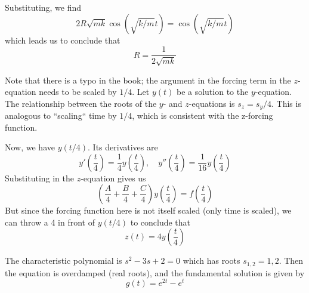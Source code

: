 \documentclass[a4paper]{article}
\begin{document}
\vspace{12pt}


Substituting, we find
\[
	2R \sqrt{mk} \cos\!\left( \sqrt{k / m } t \right) = \cos\!\left( \sqrt{k / m } t \right)  
\]
which leads us to conclude that
\[
	R = \frac{1}{2 \sqrt{mk}} 
\]


Note that there is a typo in the book; the argument in the forcing term in the \( z \)-equation needs to be scaled by \( 1/4 \). Let \( y \!\left( t  \right) \) be a solution to the \( y \)-equation. The relationship between the roots of the \( y \)- and \( z \)-equations is \( s_{z} = s_{y}/4 \). This is analogous to ``scaling`` time by \( 1/4 \), which is consistent with the z-forcing function.

Now, we have \( y \!\left( t / 4 \right) \). Its derivatives are
\[
	y'\!\left( \frac{t }{4} \right) = \frac{1}{4}y \!\left( \frac{t}{4} \right), \quad y''\!\left( \frac{t }{4} \right) = \frac{1}{16}y \!\left( \frac{t }{4} \right) 
\]
Substituting in the \( z \)-equation gives us
\[
	\!\left( \frac{A }{4} + \frac{B }{4} + \frac{C }{4} \right) y \!\left( \frac{t }{4} \right) = f \!\left( \frac{t }{4} \right)
\]
But since the forcing function here is not itself scaled (only time is scaled), we can throw a 4 in front of \( y \!\left( t/4 \right) \) to conclude that
\[
	z \!\left( t  \right) = 4 y \!\left( \frac{t }{4} \right) 
\]


The characteristic polynomial is \( s^{2} -3s + 2 = 0 \) which has roots \( s_{1,2} = 1, 2 \). Then the equation is overdamped (real roots), and the fundamental solution is given by
\[
	g \!\left( t  \right) = e^{2t } - e^{t } 
\]

\end{document}
